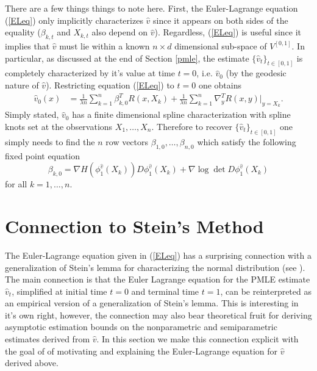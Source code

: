 \documentclass[noinfoline]{imsart}
\begin{document}
   There are a few things things to note here. First, the Euler-Lagrange equation  (\ref{ELeq}) only implicitly characterizes $\hat v$ since it appears on both sides of the equality ($\beta_{k,t}$ and $X_{k,t}$ also  depend on $\hat v$). Regardless,  (\ref{ELeq}) is useful since it implies that $\hat v$ must lie within a known $n\times d$ dimensional sub-space of $V^{[0,1]}$. In particular, as discussed at the end of Section \ref{pmle}, the estimate $\{ \hat v_t\}_{t\in [0,1]}$ is completely characterized by it's value at time $t=0$, i.e.\! $\hat v_0$ (by the geodesic nature of $\hat v$). Restricting equation (\ref{ELeq}) to  $t=0$ one obtains
   \begin{align}
 \label{ELeq0}
 \hat v_0(x)&=  \frac{1}{\lambda n}\sum_{k=1}^n \beta^T_{k,0} R(x,X_{k})  +  \frac{1}{\lambda n}\sum_{k=1}^n   \nabla_{y}^T R(x,y)\Bigr|_{y= X_{k}}.
\end{align}
  Simply stated, $\hat v_0$ has a finite dimensional spline characterization with spline knots set at the observations $X_1,\ldots, X_n$. Therefore to recover $\{ \hat v_t \}_{t\in[0,1]}$ one simply needs to find the $n$ row vectors $\beta_{1,0},\dots, \beta_{n,0}$ which satisfy the following fixed point equation
        \begin{equation}
 \label{InitialMom}
  \beta_{k,0}= \nabla H(\phi^{\hat v}_1(X_k))  D\phi^{\hat v}_{1}(X_k)+ \nabla \log\det D\phi^{\hat v}_{1} (X_k)
  \end{equation}
 for all $k=1,\ldots,n$. 



\section{Connection to Stein's Method}
\label{steinSection}

The Euler-Lagrange equation given in (\ref{ELeq}) has a surprising connection with a generalization of Stein's lemma for characterizing the normal distribution (see \cite{stein:04}). The main connection is that the Euler Lagrange equation for the PMLE estimate $\hat v_t$, simplified at initial time $t=0$ and terminal time $t=1$, can be reinterpreted as an empirical version of a generalization of Stein's lemma. This is interesting in it's own right, however, the connection may also bear theoretical fruit for deriving asymptotic estimation bounds on the nonparametric and semiparametric estimates derived from $\hat v$. In this section we make this connection explicit  with the goal of of motivating and explaining the Euler-Lagrange equation for $\hat v$ derived above.
\end{document}

